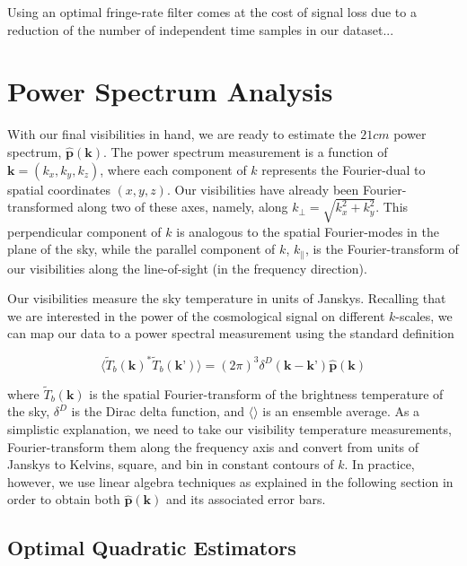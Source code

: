 \documentclass[preprint2,numberedappendix,tighten,twocolappendix]{aastex6}  %
\begin{document}
Using an optimal fringe-rate filter comes at the cost of signal loss due to a reduction of the number of independent time samples in our dataset...

\section{Power Spectrum Analysis}
\label{sec:PS}

With our final visibilities in hand, we are ready to estimate the $21 cm$ power spectrum, $\hat{\textbf{p}}(\textbf{k})$. The power spectrum measurement is a function of $\textbf{k} = (k_{x},k_{y},k_{z})$, where each component of $k$ represents the Fourier-dual to spatial coordinates $(x,y,z)$. Our visibilities have already been Fourier-transformed along two of these axes, namely, along $k_{\perp} = \sqrt{k_{x}^{2}+k_{y}^{2}}$. This perpendicular component of $k$ is analogous to the spatial Fourier-modes in the plane of the sky, while the parallel component of $k$, $k_{\parallel}$, is the Fourier-transform of our visibilities along the line-of-sight (in the frequency direction). 

Our visibilities measure the sky temperature in units of Janskys. Recalling that we are interested in the power of the cosmological signal on different $k$-scales, we can map our data to a power spectral measurement using the standard definition

\begin{equation}
\label{eq:ps}
\langle \tilde{T}_{b}(\textbf{k})^{*}\tilde{T}_{b}(\textbf{k'})\rangle = (2\pi)^{3} \delta^{D}(\textbf{k}-\textbf{k'})\hat{\textbf{p}}(\textbf{k})
\end{equation}

\noindent where $\tilde{T}_{b}(\textbf{k})$ is the spatial Fourier-transform of the brightness temperature of the sky, $\delta^{D}$ is the Dirac delta function, and $\langle \rangle$ is an ensemble average. As a simplistic explanation, we need to take our visibility temperature measurements, Fourier-transform them along the frequency axis and convert from units of Janskys to Kelvins, square, and bin in constant contours of $k$. In practice, however, we use linear algebra techniques as explained in the following section in order to obtain both $\hat{\textbf{p}}(\textbf{k})$ and its associated error bars. 

\subsection{Optimal Quadratic Estimators}
\label{sec:OQE}
\end{document}

